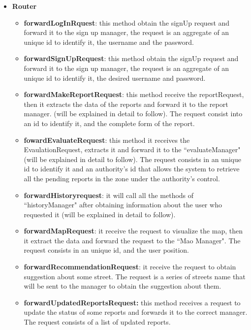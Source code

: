 \documentclass[12pt,a4paper]{report}
\begin{document}
					\begin{itemize}
						\item \textbf{Router}
						\begin{itemize}
							\item \textbf{forwardLogInRquest}: this method obtain the signUp request and
								forward it to the sign up manager, the request is an aggregate of an unique id to
								identify it, the username and the password.
							\item \textbf{forwardSignUpRequest}: this method obtain the signUp request and forward 
								it to the sign up manager, the request is an aggregate of an unique id to identify it,
								the desired username and password.
							\item \textbf{forwardMakeReportRequest}: this method receive the reportRequest,
								then it extracts the data of the reports and forward it to the report manager.
								(will be explained in detail to follow).  The request consist into an id to identify it,
								and the complete form of the report.
							\item \textbf{fowardEvaluateRequest}: this method it receives the EvaulationRequest,
								extracts it and forward it to the ``evaluateManager"
								(will be explained in detail to follow). The request consists in an unique id to identify
								it and an authority's id that allows the system to retrieve all the pending reports
								in the zone under the authority's control.
							\item \textbf{forwardHistoryrequest}: it will call all the methods of
								``historyManager" after obtaining information about the user who requested it (will
								be explained in detail to follow).
							\item \textbf{forwardMapRequest}: it receive the request to visualize the map, then it
								extract the data and forward the request to the ``Mao Manager". The request
								consists in an unique id, and the user position.
							\item \textbf{forwardRecommendationRequest}: it receive the request to obtain
								suggestion about some street. The request is a series of streets name that will be
								sent to the manager to obtain the suggestion about them.
							\item \textbf{forwardUpdatedReportsRequest:}  this method receives a request to
								update the status of some reports and forwards it to the correct manager. The
								request
								consists of a list of updated reports.

\end{itemize}
\end{itemize}
\end{document}
